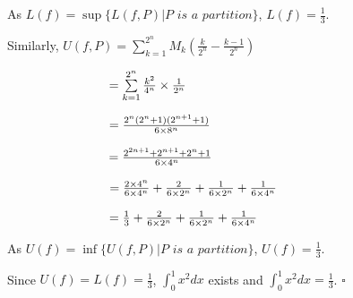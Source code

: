 \documentclass{article}
\begin{document}
\begin{enumerate}
    As $L(f) = \sup\{ L(f, P) | P \textit{ is a partition}\}$, $L(f) = \frac{1}{3}$.

    Similarly, $U(f, P) = \sum\limits_{k=1}^{2^n} M_k(\frac{k}{2^n} - \frac{k-1}{2^n}) $

    $\hspace{2.85cm}= \sum\limits_{k=1}^{2^n} \frac{k^2}{4^n} \times \frac{1}{2^n}$
    
    $\hspace{2.85cm}= \frac{2^n(2^n+1)(2^{n+1}+1)}{6\times8^n}$
    
    $ \hspace{2.85cm}= \frac{2^{2n+1} +2^{n+1} + 2^n +1}{6\times4^n} $
    
    $\hspace{2.85cm}= \frac{2\times4^n}{6\times4^n} + \frac{2}{6\times2^n} + \frac{1}{6\times2^n} + \frac{1}{6\times 4^n} $
    
    $\hspace{2.85cm}= \frac{1}{3} + \frac{2}{6\times2^n} + \frac{1}{6\times2^n} + \frac{1}{6\times 4^n}$

    As $U(f) = \inf \{ U(f, P) | P \textit{ is a partition}\}$, $U(f) = \frac{1}{3}$.

    Since $U(f) = L(f) = \frac{1}{3}$, $\int_{0}^1 x^2 \textit{dx}$ exists and $\int_{0}^1 x^2 \textit{dx} = \frac{1}{3}$. $\square$
\end{enumerate}
\end{document}
